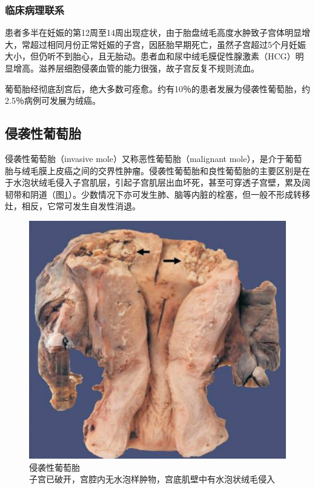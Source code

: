 \subsubsection{临床病理联系}

患者多半在妊娠的第12周至14周出现症状，由于胎盘绒毛高度水肿致子宫体明显增大，常超过相同月份正常妊娠的子宫，因胚胎早期死亡，虽然子宫超过5个月妊娠大小，但仍听不到胎心，且无胎动。患者血和尿中绒毛膜促性腺激素（HCG）明显增高。滋养层细胞侵袭血管的能力很强，故子宫反复不规则流血。

葡萄胎经彻底刮宫后，绝大多数可痊愈。约有10％的患者发展为侵袭性葡萄胎，约2.5％病例可发展为绒癌。

\subsection{侵袭性葡萄胎}

侵袭性葡萄胎（invasive mole）又称恶性葡萄胎（malignant
mole），是介于葡萄胎与绒毛膜上皮癌之间的交界性肿瘤。侵袭性葡萄胎和良性葡萄胎的主要区别是在于水泡状绒毛侵入子宫肌层，引起子宫肌层出血坏死，甚至可穿透子宫壁，累及阔韧带和阴道（图\ref{fig11-6}）。少数情况下亦可发生肺、脑等内脏的栓塞，但一般不形成转移灶，相反，它常可发生自发性消退。

\begin{figure}[!htbp]
 \centering
 \includegraphics{./images/Image00191.jpg}
 \captionsetup{justification=centering}
 \caption{侵袭性葡萄胎\\ {\small 子宫已破开，宫腔内无水泡样肿物，宫底肌壁中有水泡状绒毛侵入}}
\label{fig11-6}
  \end{figure}

